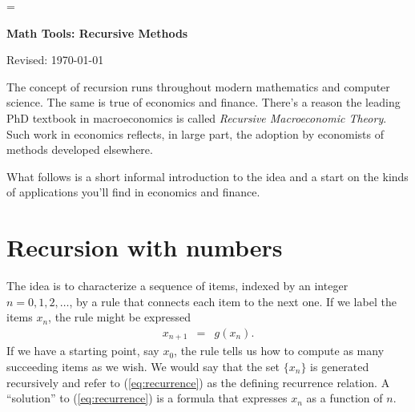 \documentclass[11pt]{article}
\begin{document}
\parskip=\bigskipamount
\parindent=0.0in
\thispagestyle{empty}


\bigskip\bigskip
\centerline{\Large \bf Math Tools:  Recursive Methods}
\centerline{Revised: \today}

\bigskip
The concept of recursion runs throughout modern mathematics and computer science.
The same is true of economics and finance.
There's a reason the leading PhD textbook in macroeconomics
is called {\it Recursive Macroeconomic Theory\/}.
Such work in economics reflects, in large part, the adoption by economists of methods
developed elsewhere.

What follows is a short informal introduction to the idea and a start
on the kinds of applications you'll find in economics and finance.


\section{Recursion with numbers}

The idea is to characterize a sequence of items, indexed by an integer $n=0,1,2,\ldots$,
by a rule that connects each item to the next one.
If we label the items $x_n$, the rule might be expressed
\begin{eqnarray}
    x_{n+1} &=& g (x_n) .
    \label{eq:recurrence}
\end{eqnarray}
If we have a starting point, say $x_0$, the rule tells us how to compute
as many succeeding items as we wish.
We would say that the set $\{x_n\}$ is generated recursively
and refer to (\ref{eq:recurrence}) as the defining recurrence relation.
A ``solution'' to (\ref{eq:recurrence}) is a formula
that expresses $x_n$ as a function of $n$.
\end{document}
